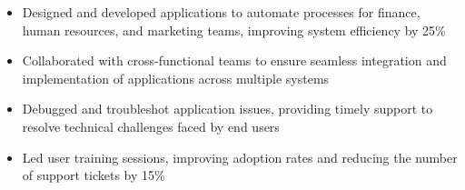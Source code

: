 \par\bigskip
{}
\par\smallskip
\begin{minipage}{13.75cm}
  \begin{minipage}{6.5cm}
    \begin{itemize}
      \item Designed and developed applications to automate processes for finance, human resources, and marketing teams, improving system efficiency by 25\%
      \item Collaborated with cross-functional teams to ensure seamless integration and implementation of applications across multiple systems
    \end{itemize}
  \end{minipage}
  \hfill
  \begin{minipage}{6.5cm}
    \begin{itemize}
      \item Debugged and troubleshot application issues, providing timely support to resolve technical challenges faced by end users
      \item Led user training sessions, improving adoption rates and reducing the number of support tickets by 15\%
    \end{itemize}
  \end{minipage}
\end{minipage}
\par\smallskip
\divider

